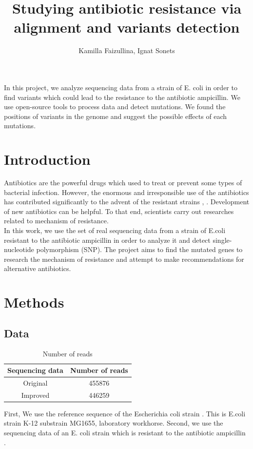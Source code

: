 \documentclass{article}
\title{Studying antibiotic resistance via alignment and variants detection}
\author{ Kamilla Faizullina, Ignat Sonets}
\date{\empty}
\begin{document}
\maketitle
In this project, we analyze sequencing data from a strain of E. coli in order to find variants which could lead to the resistance to the antibiotic ampicillin. We use open-source tools to process data and detect mutations. We found the positions of variants in the genome and suggest the possible effects of each mutations. 

\section{Introduction}
Antibiotics are the powerful drugs which used to treat or prevent some types of bacterial infection. However, the enormous and irresponsible use of the antibiotics  has contributed significantly to the advent of the resistant strains \cite{anti}, \cite{anti2}. Development of new antibiotics can be helpful. To that end, scientists carry out researches related to mechanism of resistance. 
\\
In this work, we use the set of real sequencing data from a strain of E.coli resistant to the antibiotic ampicillin in order to analyze it and detect single-nucleotide polymorphism (SNP). The project aims to find the mutated genes to research the mechanism of resistance and attempt to  make recommendations for alternative antibiotics. 
 
\section{Methods}
\subsection{Data}

\begin{table}[h!]
	\centering
	\begin{tabular}{||c c ||} 
		\hline
		Sequencing data  &  Number of reads    \\ [0.5ex] 
		\hline\hline
		Original  & 455876    \\ 
		Improved & 446259 \\ [1ex] 
		\hline
	\end{tabular}
	\caption{Number of reads }
	\label{table:reads}
\end{table}



First, We use the reference  sequence of the  Escherichia coli strain \cite{datalink}. This is E.coli strain K-12 substrain MG1655, laboratory workhorse.  Second, we use the sequencing data of an E. coli strain which is resistant to the antibiotic ampicillin \cite{datalink_res}.
\end{document}
